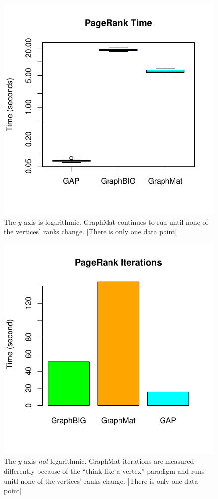 \documentclass[conference]{IEEEtran}
\begin{document}
\begin{figure}
	\centering
	\includegraphics[width=0.8\columnwidth]{graphics/pr_time.pdf}
	\vspace{-18pt}
	\caption{The $y$-axis is logarithmic. GraphMat continues to run until none of the vertices' ranks change. [There is only one data point]}
	\label{fig:pr-time}
\end{figure}

\begin{figure}
	\centering
	\includegraphics[width=0.8\columnwidth]{graphics/pr_iters.pdf}
	\vspace{-18pt}
	\caption{The $y$-axis \emph{not} logarithmic. GraphMat iterations are measured differently because of the ``think like a vertex'' paradigm and runs unitl none of the vertices' ranks change. [There is only one data point]}
	\label{fig:pr-iters}
\end{figure}
\end{document}
